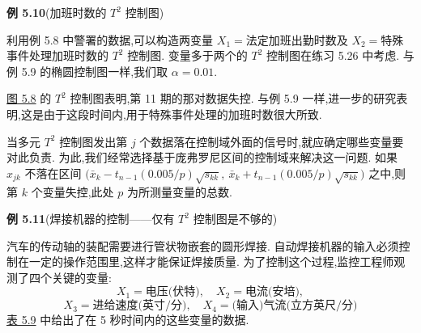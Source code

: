 \noindent\textbf{例 5.10}\quad (加班时数的 $T^{2}$ 控制图)

利用例 5.8 中警署的数据,可以构造两变量 $X_1=$法定加班出勤时数及 $X_2=$特殊事件处理加班时数的 $T^{2}$ 控制图. 变量多于两个的 $T^{2}$ 控制图在练习 5.26 中考虑. 与例 5.9 的椭圆控制图一样,我们取 $\alpha=0.01$.

\hyperref[fig:5.8]{图 5.8} 的 $T^{2}$ 控制图表明,第 11 期的那对数据失控. 与例 5.9 一样,进一步的研究表明,这是由于这段时间内,用于特殊事件处理的加班时数很大所致.

\begin{mvfigure}
\label{fig:5.8}
\end{mvfigure}

当多元 $T^{2}$ 控制图发出第 $j$ 个数据落在控制域外面的信号时,就应确定哪些变量要对此负责. 为此,我们经常选择基于庞弗罗尼区间的控制域来解决这一问题. 如果 $x_{jk}$ 不落在区间 $\bigl(\bar{x}_k-t_{n-1}(0.005/p)\sqrt{s_{kk}},\ \bar{x}_k+t_{n-1}(0.005/p)\sqrt{s_{kk}}\bigr)$ 之中,则第 $k$ 个变量失控,此处 $p$ 为所测量变量的总数.

\noindent\textbf{例 5.11}\quad (焊接机器的控制——仅有 $T^{2}$ 控制图是不够的)

汽车的传动轴的装配需要进行管状物嵌套的圆形焊接. 自动焊接机器的输入必须控制在一定的操作范围里,这样才能保证焊接质量. 为了控制这个过程,监控工程师观测了四个关键的变量:
\[
X_1=\text{电压(伏特)},\quad X_2=\text{电流(安培)},
\]
\[
X_3=\text{进给速度(英寸/分)},\quad X_4=\text{(输入)气流(立方英尺/分)}
\]
\hyperref[tab:5.9]{表 5.9} 中给出了在 5 秒时间内的这些变量的数据.


